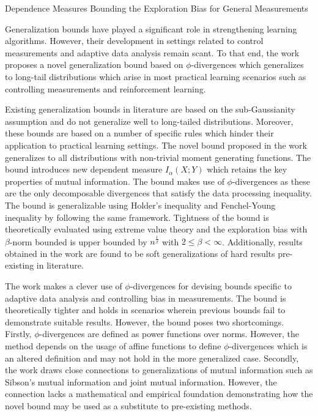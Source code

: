 \documentclass[11pt,letterpaper]{article}
\begin{document}
\begin{center}
  \large{Dependence Measures Bounding the Exploration
  Bias for General Measurements}
\end{center}

Generalization bounds have played a significant role in strengthening learning algorithms. However, their development in settings related to control measurements and adaptive data analysis remain scant. To that end, the work proposes a novel generalization bound based on $\phi$-divergences which generalizes to long-tail distributions which arise in most practical learning scenarios such as controlling measurements and reinforcement learning. 

Existing generalization bounds in literature are based on the sub-Gaussianity assumption and do not generalize well to long-tailed distributions. Moreover, these bounds are based on a number of specific rules which hinder their application to practical learning settings. The novel bound proposed in the work generalizes to all distributions with non-trivial moment generating functions. The bound introduces new dependent measure $I_{\alpha}(X;Y)$ which retains the key properties of mutual information. The bound makes use of $\phi$-divergences as these are the only decomposable divergences that satisfy the data processing inequality. The bound is generalizable using Holder's inequality and Fenchel-Young inequality by following the same framework. Tightness of the bound is theoretically evaluated using extreme value theory and the exploration bias with $\beta$-norm bounded is upper bounded by $n^{\frac{1}{\beta}}$ with $2 \leq\beta<\infty$. Additionally, results obtained in the work are found to be soft generalizations of hard results pre-existing in literature. 

The work makes a clever use of $\phi$-divergences for devising bounds specific to adaptive data analysis and controlling bias in measurements. The bound is theoretically tighter and holds in scenarios wherein previous bounds fail to demonstrate suitable results. However, the bound poses two shortcomings. Firstly, $\phi$-divergences are defined as power functions over norms. However, the method depends on the usage of affine functions to define $\phi$-divergences which is an altered definition and may not hold in the more generalized case. Secondly, the work draws close connections to generalizations of mutual information such as Sibson's mutual information and joint mutual information. However, the connection lacks a mathematical and empirical foundation demonstrating how the novel bound may be used as a substitute to pre-existing methods.
\end{document}
